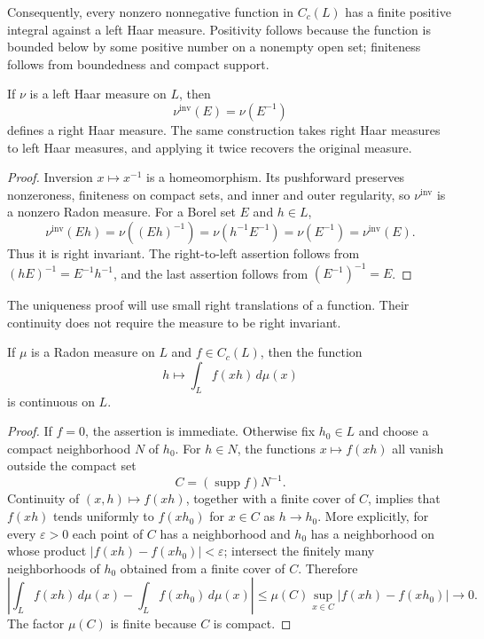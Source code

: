 Consequently, every nonzero nonnegative function in $C_c(L)$ has a finite positive integral against a left Haar measure. Positivity follows because the function is bounded below by some positive number on a nonempty open set; finiteness follows from boundedness and compact support.

\begin{proposition}\label{measure.haar-inversion}
If $\nu$ is a left Haar measure on $L$, then
\[
 \nu^{\mathrm{inv}}(E)=\nu(E^{-1})
\]
defines a right Haar measure. The same construction takes right Haar measures to left Haar measures, and applying it twice recovers the original measure.
\end{proposition}

\begin{proof}
Inversion $x\mapsto x^{-1}$ is a homeomorphism. Its pushforward preserves nonzeroness, finiteness on compact sets, and inner and outer regularity, so $\nu^{\mathrm{inv}}$ is a nonzero Radon measure. For a Borel set $E$ and $h\in L$,
\[
 \nu^{\mathrm{inv}}(Eh)
 =\nu((Eh)^{-1})
 =\nu(h^{-1}E^{-1})
 =\nu(E^{-1})
 =\nu^{\mathrm{inv}}(E).
\]
Thus it is right invariant. The right-to-left assertion follows from $(hE)^{-1}=E^{-1}h^{-1}$, and the last assertion follows from $(E^{-1})^{-1}=E$.
\end{proof}

The uniqueness proof will use small right translations of a function. Their continuity does not require the measure to be right invariant.

\begin{lemma}\label{measure.haar-translation-continuity}
If $\mu$ is a Radon measure on $L$ and $f\in C_c(L)$, then the function
\[
 h\longmapsto\int_L f(xh)\,d\mu(x)
\]
is continuous on $L$.
\end{lemma}

\begin{proof}
If $f=0$, the assertion is immediate. Otherwise fix $h_0\in L$ and choose a compact neighborhood $N$ of $h_0$. For $h\in N$, the functions $x\mapsto f(xh)$ all vanish outside the compact set
\[
 C=(\operatorname{supp}f)N^{-1}.
\]
Continuity of $(x,h)\mapsto f(xh)$, together with a finite cover of $C$, implies that $f(xh)$ tends uniformly to $f(xh_0)$ for $x\in C$ as $h\to h_0$. More explicitly, for every $\varepsilon>0$ each point of $C$ has a neighborhood and $h_0$ has a neighborhood on whose product $|f(xh)-f(xh_0)|<\varepsilon$; intersect the finitely many neighborhoods of $h_0$ obtained from a finite cover of $C$. Therefore
\[
 \left|\int_L f(xh)\,d\mu(x)-\int_L f(xh_0)\,d\mu(x)\right|
 \leq \mu(C)\sup_{x\in C}|f(xh)-f(xh_0)|\longrightarrow0.
\]
The factor $\mu(C)$ is finite because $C$ is compact.
\end{proof}

